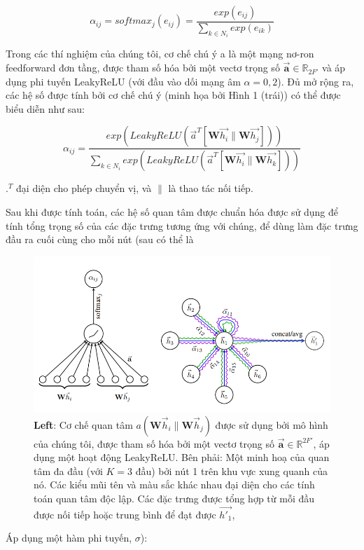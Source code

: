 \[\alpha_{ij} = softmax_j{(e_{ij})} = \frac{ exp(e_{ij} ) }{{\displaystyle \sum}_{k \in N_i}exp(e_{ik})}\]

Trong các thí nghiệm của chúng tôi, cơ chế chú ý a là một mạng nơ-ron feedforward đơn tầng, được tham số hóa bởi một vectơ trọng số 
\(\vec{\textbf{a}} \in \mathbb{R}_{2F'}\) 
và áp dụng phi tuyến LeakyReLU (với đầu vào dối mạng âm $ \alpha = 0,2$). Đủ mở rộng ra, các hệ số được tính bởi cơ chế chú ý (minh họa bởi Hình 1 (trái)) có thể được biểu diễn như sau:

\[
\alpha_{ij} = \frac
{exp(LeakyReLU(\vec{a}^T[\textbf{W}\vec{h_i}\|\textbf{W}\vec{h_j}]))}
{{\displaystyle \sum}_{k \in N_i} exp(LeakyReLU(\vec{a}^T[\textbf{W}\vec{h_i}\|\textbf{W}\vec{h_k}]))}
\]

$.^T$ đại diện cho phép chuyển vị, và $\|$ là thao tác nối tiếp. 

Sau khi được tính toán, các hệ số quan tâm được chuẩn hóa được sử dụng để tính tổng trọng số của các đặc trưng tương ứng với chúng, để dùng làm đặc trưng đầu ra cuối cùng cho mỗi nút (sau có thể là

\begin{figure} [!hp]
	\includegraphics[scale = 1]{Chapter1/Figs/Figure1.png}
	\caption{\textbf{Left}: Cơ chế quan tâm 
			\(a(\textbf{W}\vec{h}_i\|\textbf{W}\vec{h}_j)\)
			được sử dụng bởi mô hình của chúng tôi, được tham số hóa bởi một vectơ trọng số 
			\(\vec{\textbf{a}} \in \mathbb{R}^{2F'}\),
		   áp dụng một hoạt động LeakyReLU. Bên phải: Một minh hoạ của quan tâm đa đầu (với $K = 3$ đầu) bởi nút 1 trên khu vực xung quanh của nó. Các kiểu mũi tên và màu sắc khác nhau đại diện cho các tính toán quan tâm độc lập. Các đặc trưng được tổng hợp từ mỗi đầu được nối tiếp hoặc trung bình để đạt được $\vec{h'_1}$,}
	\label{fig:figure1}
\end{figure}
Áp dụng một hàm phi tuyến, $\sigma$):

